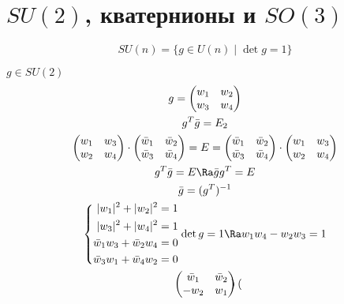 ﻿\section{\texorpdfstring{$SU(2)$}{SU(2)}, кватернионы и \texorpdfstring{$SO(3)$}{SO(3)}}

\begin{Def}
    \[ SU(n) = \{g \in U(n) \mid \det g = 1\} \]
\end{Def}
$g \in SU(2)$
\begin{gather*}
    g = \begin{pmatrix}
        w_1 & w_2 \\
        w_3 & w_4
    \end{pmatrix} \\
    g^T\bar g = E_2 \\
    \begin{pmatrix}
        w_1 & w_3 \\
        w_2 & w_4
    \end{pmatrix} \cdot \begin{pmatrix}
        \bar w_1 & \bar w_2 \\
        \bar w_3 & \bar w_4
    \end{pmatrix} = E = \begin{pmatrix}
        \bar w_1 & \bar w_2 \\
        \bar w_3 & \bar w_4
    \end{pmatrix} \cdot \begin{pmatrix}
        w_1 & w_3 \\
        w_2 & w_4
    \end{pmatrix} \\
    g^T\bar g = E \Ra \bar g g^T = E \\
    \bar g = (g^T)^{-1} \\
    \left\{
    \begin{aligned}
    |w_1|^2 + |w_2|^2 = 1 \\
    |w_3|^2 + |w_4|^2 = 1 \\
    \bar w_1w_3 + \bar w_2 w_4 = 0 \\
    \bar w_3w_1 + \bar w_4 w_2 = 0 \\
    \end{aligned}
    \right.
    \det g = 1 \Ra w_1w_4 - w_2w_3 = 1 \\
    \begin{pmatrix}
        \bar w_1 & \bar w_2 \\
        -w_2 & w_1
    \end{pmatrix}\begin{pmatrix}

\end{pmatrix}
\end{gather*}
